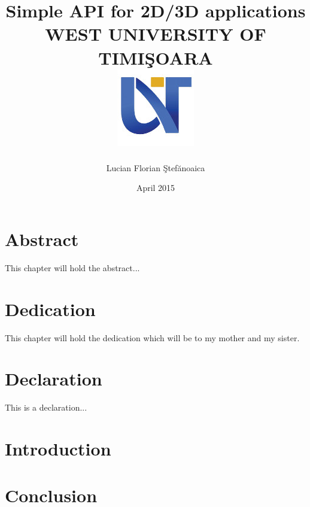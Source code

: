 \documentclass[a4paper, 12pt, twoside]{report}
\title{
	{Simple API for 2D/3D applications}\\
	\vspace{2.5cm}
	{\large WEST UNIVERSITY OF TIMI\c SOARA}\\
	{\includegraphics{uvt_logo.jpg}}
}
\author{Lucian Florian \c Stef\u anoaica}
\date{April 2015}
\begin{document}
\maketitle

\chapter*{Abstract}
This chapter will hold the abstract...

\chapter*{Dedication}
This chapter will hold the dedication which will be to my mother and my sister.

\chapter*{Declaration}
This is a declaration...

\tableofcontents

\chapter{Introduction}

\chapter{Conclusion}


\end{document}
